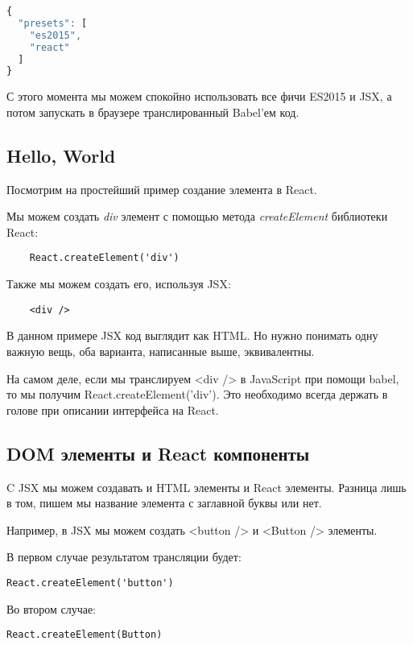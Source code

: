 \documentclass[12pt]{book}
\begin{document}
\begin{lstlisting}[language=JavaScript]
{
  "presets": [
    "es2015",
    "react" 
  ]
}

\end{lstlisting}

С этого момента мы можем спокойно использовать все фичи ES2015 и JSX, а потом запускать в браузере транслированный Babel'ем код.

\subsection*{Hello, World}

Посмотрим на простейший пример создание элемента в React. 

Мы можем создать \textit{div} элемент с помощью метода \textit{createElement} библиотеки React:

\begin{lstlisting}
	React.createElement('div')
\end{lstlisting}

Также мы можем создать его, используя JSX:

\begin{lstlisting}
	<div />
\end{lstlisting}

В данном примере JSX код выглядит как HTML. Но нужно понимать одну важную вещь, оба варианта, написанные выше, эквивалентны. 

На самом деле, если мы транслируем <div /> в JavaScript при помощи babel, то мы получим React.createElement('div'). Это необходимо всегда держать в голове при описании интерфейса на React.

\subsection*{DOM элементы и React компоненты}

C JSX мы можем создавать и HTML элементы и React элементы. Разница лишь в том, пишем мы название элемента с заглавной буквы или нет.

Например, в JSX мы можем создать <button /> и <Button /> элементы.

В первом случае результатом трансляции будет:

\begin{lstlisting}
React.createElement('button')
\end{lstlisting}

Во втором случае:

\begin{lstlisting}
React.createElement(Button)
\end{lstlisting}
\end{document}
